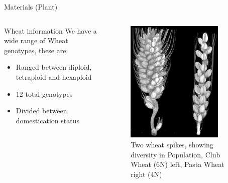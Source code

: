 \documentclass[t, aspectratio=169]{beamer}
\begin{document}
\begin{frame}[label={sec:orgfd9c907}]{Materials (Plant)}
\begin{columns}
\begin{column}{0.4\columnwidth}
\begin{block}{Wheat information}
We have a wide range of Wheat genotypes, these are:
\begin{itemize}
\item Ranged between diploid, tetraploid and hexaploid
\item 12 total genotypes
\item Divided between domestication status
\end{itemize}
\end{block}
\end{column}

\begin{column}{0.6\columnwidth}
\vspace{-1.7cm}
\begin{figure}[htbp]
\centering
\includegraphics[width=4.6cm]{./images/spikes.png}
\caption{Two wheat spikes, showing diversity in Population, Club Wheat (6N) left, Pasta Wheat right (4N)}
\end{figure}
\end{column}
\end{columns}
\end{frame}
\end{document}
